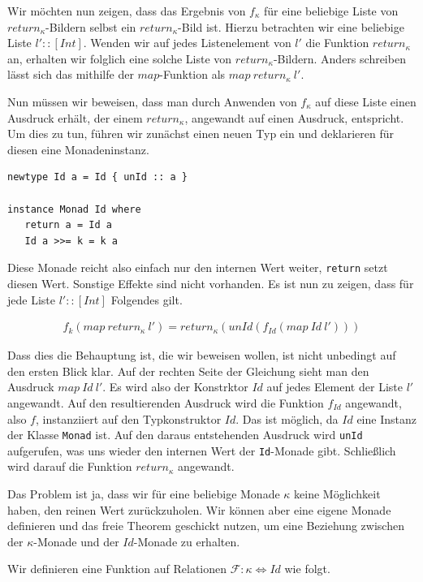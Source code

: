 Wir möchten nun zeigen, dass das Ergebnis von $f_{\kappa}$ für eine beliebige Liste von $return_{\kappa}$-Bildern selbst ein
$return_{\kappa}$-Bild ist. Hierzu betrachten wir eine beliebige Liste $l' :: [Int]$. Wenden wir auf jedes Listenelement von $l'$ die
Funktion $return_{\kappa}$ an, erhalten wir folglich eine solche Liste von $return_{\kappa}$-Bildern. Anders schreiben lässt
sich das mithilfe der $map$-Funktion als $map\ return_{\kappa}\ l'$.

Nun müssen wir beweisen, dass man durch Anwenden von $f_{\kappa}$ auf diese Liste einen Ausdruck erhält, der einem
$return_{\kappa}$, angewandt auf einen Ausdruck, entspricht. Um dies zu tun, führen wir zunächst einen neuen Typ ein und deklarieren
für diesen eine Monadeninstanz.

\begin{verbatim}
newtype Id a = Id { unId :: a }

instance Monad Id where
   return a = Id a
   Id a >>= k = k a
\end{verbatim}

Diese Monade reicht also einfach nur den internen Wert weiter, \texttt{return} setzt diesen Wert. Sonstige Effekte
sind nicht vorhanden.
Es ist nun zu zeigen, dass für jede Liste $l' :: [Int]$ Folgendes gilt.

\begin{align*}
f_k (map\ return_{\kappa}\ l') = return_{\kappa} (unId (f_{Id} (map\ Id\ l')))
\end{align*}

Dass dies die Behauptung ist, die wir beweisen wollen, ist nicht unbedingt auf den ersten Blick klar. Auf der rechten
Seite der Gleichung sieht man den Ausdruck $map\ Id\ l'$. Es wird also der Konstrktor $Id$ auf jedes Element der Liste $l'$
angewandt. Auf den resultierenden Ausdruck wird die Funktion $f_{Id}$ angewandt, also $f$, instanziiert auf den
Typkonstruktor $Id$. Das ist möglich, da $Id$ eine Instanz der Klasse \texttt{Monad} ist. Auf den daraus entstehenden Ausdruck
wird \texttt{unId} aufgerufen, was uns wieder den internen Wert der \texttt{Id}-Monade gibt. Schließlich wird darauf die
Funktion $return_{\kappa}$ angewandt.

Das Problem ist ja, dass wir für eine beliebige Monade $\kappa$ keine Möglichkeit haben, den reinen Wert zurückzuholen. Wir können
aber eine eigene Monade definieren und das freie Theorem geschickt nutzen, um eine Beziehung zwischen der $\kappa$-Monade
und der $Id$-Monade zu erhalten.

Wir definieren eine Funktion auf Relationen $\mathcal{F} : \kappa \Leftrightarrow Id$ wie folgt.

